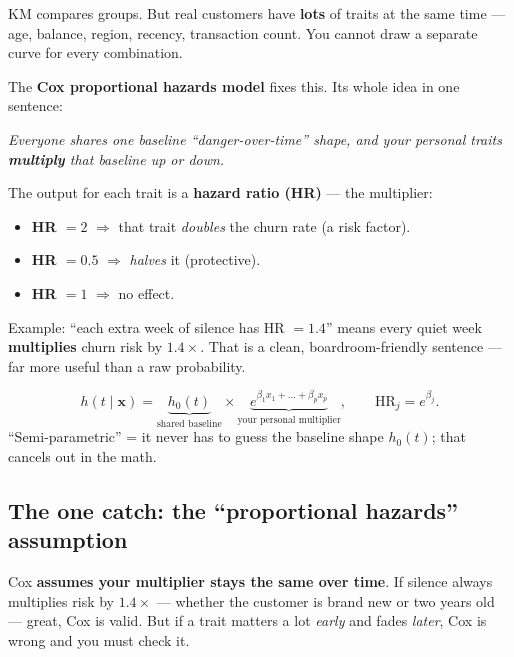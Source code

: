 \documentclass[11pt]{article}
\begin{document}
KM compares groups. But real customers have \textbf{lots} of traits at the same time --- age,
balance, region, recency, transaction count. You cannot draw a separate curve for every combination.

The \textbf{Cox proportional hazards model} fixes this. Its whole idea in one sentence:

\begin{plainbox}
\emph{Everyone shares one baseline ``danger-over-time'' shape, and your personal traits
\textbf{multiply} that baseline up or down.}
\end{plainbox}

The output for each trait is a \textbf{hazard ratio (HR)} --- the multiplier:
\begin{itemize}[leftmargin=1.4em]
  \item \textbf{HR $=2$} $\Rightarrow$ that trait \emph{doubles} the churn rate (a risk factor).
  \item \textbf{HR $=0.5$} $\Rightarrow$ \emph{halves} it (protective).
  \item \textbf{HR $=1$} $\Rightarrow$ no effect.
\end{itemize}

Example: ``each extra week of silence has HR $=1.4$'' means every quiet week \textbf{multiplies}
churn risk by $1.4\times$. That is a clean, boardroom-friendly sentence --- far more useful than a
raw probability.

\begin{mathbox}
$$h(t\mid \mathbf x)=\underbrace{h_0(t)}_{\text{shared baseline}}\times
\underbrace{e^{\beta_1 x_1+\dots+\beta_p x_p}}_{\text{your personal multiplier}},
\qquad \mathrm{HR}_j=e^{\beta_j}.$$
``Semi-parametric'' = it never has to guess the baseline shape $h_0(t)$; that cancels out in the math.
\end{mathbox}

\subsection{The one catch: the ``proportional hazards'' assumption}
\begin{plainbox}
Cox \textbf{assumes your multiplier stays the same over time}. If silence always multiplies risk by
$1.4\times$ --- whether the customer is brand new or two years old --- great, Cox is valid. But if a
trait matters a lot \emph{early} and fades \emph{later}, Cox is wrong and you must check it.
\end{plainbox}
\end{document}
